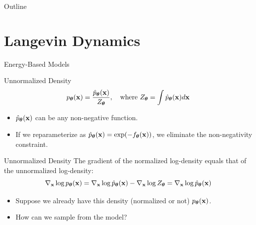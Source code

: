 \documentclass{beamer}
\renewcommand{\eqpause}{}
\begin{document}
\begin{frame}
	\titlepage
	\resetonslide
\end{frame}









\begin{frame}{Outline}
	\tableofcontents[part=6]
\end{frame}
\section{Langevin Dynamics}
\begin{frame}{Energy-Based Models}
	\begin{block}{Unnormalized Density}
		\vspace{-0.2cm}
		\[
			p_{\boldsymbol{\theta}}(\mathbf{x}) = \frac{\hat{p}_{\boldsymbol{\theta}}(\mathbf{x})}{Z_{\boldsymbol{\theta}}}, \quad \text{where } Z_{\boldsymbol{\theta}} = \int \hat{p}_{\boldsymbol{\theta}}(\mathbf{x}) d \mathbf{x}
		\]
		\vspace{-0.3cm}
		\begin{itemize}
			\item $\hat{p}_{\boldsymbol{\theta}}(\mathbf{x})$ can be any non-negative function. \\
			\item If we reparameterize as $\hat{p}_{\boldsymbol{\theta}}(\mathbf{x}) = \exp(-f_{\boldsymbol{\theta}}(\mathbf{x}))$, we eliminate the non-negativity constraint.
		\end{itemize}
	\end{block}
	\eqpause
	\vspace{-0.3cm}
	\begin{block}{Unnormalized Density}
		The gradient of the normalized log-density equals that of the unnormalized log-density:
		\[
			\nabla_{\mathbf{x}} \log p_{\boldsymbol{\theta}}(\mathbf{x}) = \nabla_{\mathbf{x}} \log \hat{p}_{\boldsymbol{\theta}}(\mathbf{x}) - \nabla_{\mathbf{x}} \log Z_{\boldsymbol{\theta}} = \nabla_{\mathbf{x}} \log \hat{p}_{\boldsymbol{\theta}}(\mathbf{x})
		\]
	\end{block}
	\eqpause
	\vspace{-0.3cm}
	\begin{itemize}
		\item Suppose we already have this density (normalized or not) $p_{\boldsymbol{\theta}}(\mathbf{x})$.
		\item How can we sample from the model?
	\end{itemize}
\end{frame}
\end{document}
